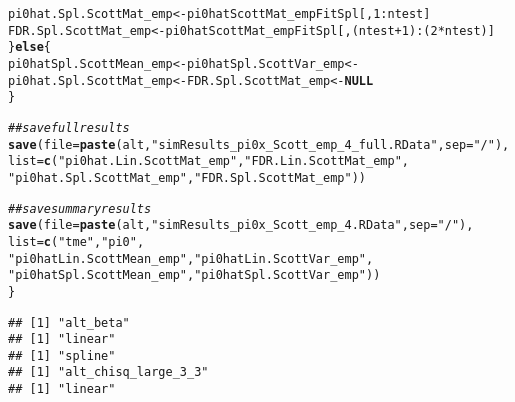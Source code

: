 \documentclass{article}\usepackage[]{graphicx}\usepackage[]{color}
\makeatletter
\newcommand{\hlnum}[1]{\textcolor[rgb]{0.686,0.059,0.569}{#1}}%
\newcommand{\hlstr}[1]{\textcolor[rgb]{0.192,0.494,0.8}{#1}}%
\newcommand{\hlcom}[1]{\textcolor[rgb]{0.678,0.584,0.686}{\textit{#1}}}%
\newcommand{\hlopt}[1]{\textcolor[rgb]{0,0,0}{#1}}%
\newcommand{\hlstd}[1]{\textcolor[rgb]{0.345,0.345,0.345}{#1}}%
\newcommand{\hlkwa}[1]{\textcolor[rgb]{0.161,0.373,0.58}{\textbf{#1}}}%
\newcommand{\hlkwb}[1]{\textcolor[rgb]{0.69,0.353,0.396}{#1}}%
\newcommand{\hlkwc}[1]{\textcolor[rgb]{0.333,0.667,0.333}{#1}}%
\newcommand{\hlkwd}[1]{\textcolor[rgb]{0.737,0.353,0.396}{\textbf{#1}}}%
\newenvironment{kframe}{%
 \def\at@end@of@kframe{}%
 \ifinner\ifhmode%
  \def\at@end@of@kframe{\end{minipage}}%
  \begin{minipage}{\columnwidth}%
 \fi\fi%
 \def\FrameCommand##1{\hskip\@totalleftmargin \hskip-\fboxsep
 \colorbox{shadecolor}{##1}\hskip-\fboxsep
     \hskip-\linewidth \hskip-\@totalleftmargin \hskip\columnwidth}%
 \MakeFramed {\advance\hsize-\width
   \@totalleftmargin\z@ \linewidth\hsize
   \@setminipage}}%
 {\par\unskip\endMakeFramed%
 \at@end@of@kframe}
\newenvironment{knitrout}{}{} %
\makeatother
\begin{document}
\begin{knitrout}
\begin{kframe}
\begin{alltt}
    \hlstd{pi0hat.Spl.ScottMat_emp} \hlkwb{<-} \hlstd{pi0hatScottMat_empFitSpl[,}\hlnum{1}\hlopt{:}\hlstd{ntest]}
    \hlstd{FDR.Spl.ScottMat_emp} \hlkwb{<-} \hlstd{pi0hatScottMat_empFitSpl[,(ntest}\hlopt{+}\hlnum{1}\hlstd{)}\hlopt{:}\hlstd{(}\hlnum{2}\hlopt{*}\hlstd{ntest)]}
  \hlstd{\}} \hlkwa{else} \hlstd{\{}
    \hlstd{pi0hatSpl.ScottMean_emp} \hlkwb{<-} \hlstd{pi0hatSpl.ScottVar_emp} \hlkwb{<-}
      \hlstd{pi0hat.Spl.ScottMat_emp} \hlkwb{<-} \hlstd{FDR.Spl.ScottMat_emp} \hlkwb{<-} \hlkwa{NULL}
  \hlstd{\}}

  \hlcom{##save full results}
  \hlkwd{save}\hlstd{(}\hlkwc{file}\hlstd{=}\hlkwd{paste}\hlstd{(alt,}\hlstr{"simResults_pi0x_Scott_emp_4_full.RData"}\hlstd{,}\hlkwc{sep}\hlstd{=}\hlstr{"/"}\hlstd{),}
       \hlkwc{list}\hlstd{=}\hlkwd{c}\hlstd{(}\hlstr{"pi0hat.Lin.ScottMat_emp"}\hlstd{,} \hlstr{"FDR.Lin.ScottMat_emp"}\hlstd{,}
              \hlstr{"pi0hat.Spl.ScottMat_emp"}\hlstd{,} \hlstr{"FDR.Spl.ScottMat_emp"}\hlstd{))}

  \hlcom{##save summary results}
  \hlkwd{save}\hlstd{(}\hlkwc{file}\hlstd{=}\hlkwd{paste}\hlstd{(alt,}\hlstr{"simResults_pi0x_Scott_emp_4.RData"}\hlstd{,}\hlkwc{sep}\hlstd{=}\hlstr{"/"}\hlstd{),}
       \hlkwc{list}\hlstd{=}\hlkwd{c}\hlstd{(}\hlstr{"tme"}\hlstd{,} \hlstr{"pi0"}\hlstd{,}
              \hlstr{"pi0hatLin.ScottMean_emp"}\hlstd{,} \hlstr{"pi0hatLin.ScottVar_emp"}\hlstd{,}
              \hlstr{"pi0hatSpl.ScottMean_emp"}\hlstd{,} \hlstr{"pi0hatSpl.ScottVar_emp"}\hlstd{))}
\hlstd{\}}
\end{alltt}
\begin{verbatim}
## [1] "alt_beta"
## [1] "linear"
## [1] "spline"
## [1] "alt_chisq_large_3_3"
## [1] "linear"
\end{verbatim}


{\ttfamily\noindent\color{warningcolor}{\#\# Warning in apply(as.matrix(pi0hatScottMat), 2, as.numeric): NAs introduced by coercion}}

{\ttfamily\noindent\color{warningcolor}{\#\# Warning in apply(as.matrix(pi0hatScottMat), 2, as.numeric): NAs introduced by coercion}}

{\ttfamily\noindent\color{warningcolor}{\#\# Warning in apply(as.matrix(pi0hatScottMat), 2, as.numeric): NAs introduced by coercion}}

{\ttfamily\noindent\color{warningcolor}{\#\# Warning in apply(as.matrix(pi0hatScottMat), 2, as.numeric): NAs introduced by coercion}}

{\ttfamily\noindent\color{warningcolor}{\#\# Warning in apply(as.matrix(pi0hatScottMat), 2, as.numeric): NAs introduced by coercion}}


\end{kframe}
\end{knitrout}
\end{document}
